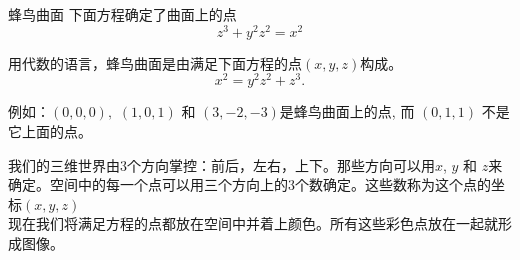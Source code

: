 ﻿\begin{surferPage}{蜂鸟曲面}
下面方程确定了曲面上的点\\
  
  \smallskip
\[z^3+ y^2	z^2	= x^2\]

\singlespacing
用代数的语言，蜂鸟曲面是由满足下面方程的点$(x, y, z)$构成。
\smallskip
\[ x^2= y^2z^2+z^3.\]

\smallskip
例如：$(0,0,0),$ $(1,0,1)$ 和 $(3,-2,-3)$是蜂鸟曲面上的点, 而 $(0,1,1)$ 不是它上面的点。\\

\singlespacing

我们的三维世界由3个方向掌控：前后，左右，上下。那些方向可以用$x$, $y$ 和 $z$来确定。空间中的每一个点可以用三个方向上的3个数确定。这些数称为这个点的坐标$(x,y,z)$\\

\singlespacing
现在我们将满足方程的点都放在空间中并着上颜色。所有这些彩色点放在一起就形成图像。
\end{surferPage}

